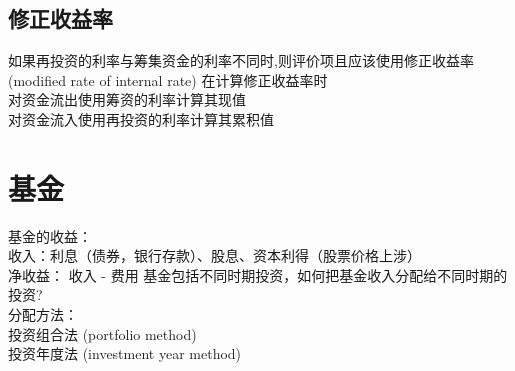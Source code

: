 \subsection{修正收益率}
如果再投资的利率与筹集资金的利率不同时,则评价项且应该使用修正收益率 (modified rate of internal rate) 在计算修正收益率时\\
对资金流出使用筹资的利率计算其现值\\
对资金流入使用再投资的利率计算其累积值
\section{基金}
\noindent 基金的收益：
\\收入：利息（债券，银行存款）、股息、资本利得（股票价格上涉）
\\净收益： 收入 - 费用
基金包括不同时期投资，如何把基金收入分配给不同时期的投资?
\\分配方法：
\\投资组合法 (portfolio method)
\\投资年度法 (investment year method)